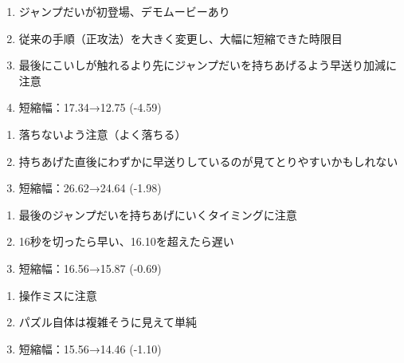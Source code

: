 \begin{enumerate}[label={\sarrow}]
\item ジャンプだいが初登場、デモムービーあり
\item 従来の手順（正攻法）を大きく変更し、大幅に短縮できた時限目
\item 最後にこいしが触れるより先にジャンプだいを持ちあげるよう早送り加減に注意
\item 短縮幅：17.34→12.75 (-4.59)
\end{enumerate}



\begin{enumerate}[label={\sarrow}]
\item 落ちないよう注意（よく落ちる）
\item 持ちあげた直後にわずかに早送りしているのが見てとりやすいかもしれない
\item 短縮幅：26.62→24.64 (-1.98)
\end{enumerate}



\begin{enumerate}[label={\sarrow}]
\item 最後のジャンプだいを持ちあげにいくタイミングに注意
\item 16秒を切ったら早い、16.10を超えたら遅い
\item 短縮幅：16.56→15.87 (-0.69)
\end{enumerate}



\begin{enumerate}[label={\sarrow}]
\item 操作ミスに注意
\item パズル自体は複雑そうに見えて単純
\item 短縮幅：15.56→14.46 (-1.10)
\end{enumerate}



